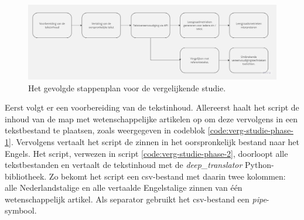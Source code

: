 \begin{figure}
\includegraphics[width=\linewidth]{img/flowchart-vergelijkende-studie.jpg}
\caption{Het gevolgde stappenplan voor de vergelijkende studie.}
\label{img:flowchart-vergelijkende-studie-metrics}
\end{figure}

\medspace

Eerst volgt er een voorbereiding van de tekstinhoud. Allereerst haalt het script de inhoud van de map met wetenschappelijke artikelen op om deze vervolgens in een tekstbestand te plaatsen, zoals weergegeven in codeblok \ref{code:verg-studie-phase-1}. Vervolgens vertaalt het script de zinnen in het oorspronkelijk bestand naar het Engels. Het script, verwezen in script \ref{code:verg-studie-phase-2}, doorloopt alle tekstbestanden en vertaalt de tekstinhoud met de \textit{deep\_translator} Python-bibliotheek. Zo bekomt het script een csv-bestand met daarin twee kolommen: alle Nederlandstalige en alle vertaalde Engelstalige zinnen van één wetenschappelijk artikel. Als separator gebruikt het csv-bestand een \textit{pipe}-symbool.

\medspace

